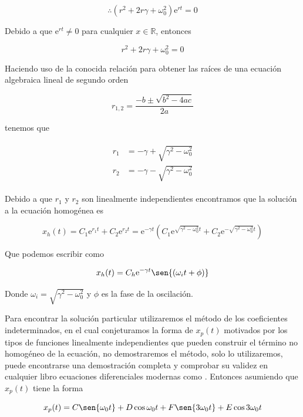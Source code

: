 \documentclass[a4paper,10pt]{article}
\numberwithin{equation}{section}
\newcommand{\euler}{\mathrm{e}}
\begin{document}
$$
\therefore \left(r^2 + 2r\gamma + \omega_0^2\right) \euler^{rt} = 0
$$

Debido a que $\euler^{rt} \neq 0$ para cualquier $x \in \mathbb{R}$, entonces

\begin{equation}
  r^2 + 2r\gamma + \omega_0^2 = 0
 \label{eq:ecuacionCaracteristica1}
\end{equation}

Haciendo uso de la conocida relación para obtener las raíces de una ecuación
algebraica lineal de segundo orden

$$
r_{1,2} = \frac{-b \pm \sqrt{b^2-4ac}}{2a}
$$

tenemos que 

\begin{align}
\begin{split}
%
r_1 &= - \gamma + \sqrt{\gamma^2 - \omega_0^2} \\
%
r_2 &= - \gamma - \sqrt{\gamma^2 - \omega_0^2}
%
\end{split}
\end{align}

Debido a que $r_1$ y $r_2$ son linealmente independientes encontramos que la solución
a la ecuación homogénea es 

\begin{equation}
 x_h(t) = C_1 \euler^{r_1 t} + C_2 \euler^{r_2 t} = \euler^{-\gamma t} (C_1 \euler^{\sqrt{\gamma^2 - \omega_0^2}t}
 + C_2 \euler^{-\sqrt{\gamma^2 - \omega_0^2}t})
\end{equation}

Que podemos escribir como

\begin{equation}
 x_h(t) = C_h \euler^{-\gamma t} \sen{(\omega_i t + \phi)}
\end{equation}

Donde $\omega_i = \sqrt{\gamma^2 - \omega_0^2}$ y $\phi$ es la fase de la oscilación.


Para encontrar la solución particular utilizaremos el método de los coeficientes indeterminados, 
en el cual conjeturamos la forma de $x_p (t)$ motivados por los tipos de funciones linealmente
independientes que pueden construir el término no homogéneo de la ecuación, no demostraremos
el método, solo lo utilizaremos, puede encontrarse una demostración completa y comprobar
su validez en cualquier libro ecuaciones diferenciales modernas como \cite{zill}. Entonces
asumiendo que $x_p (t)$ tiene la forma

\begin{equation}
 x_p (t) = C \sen{\omega_0t} + D \cos{\omega_0t} + F \sen{3 \omega_0t} + E \cos{3 \omega_0t}
 \label{eq:particular1}
\end{equation}
\end{document}

